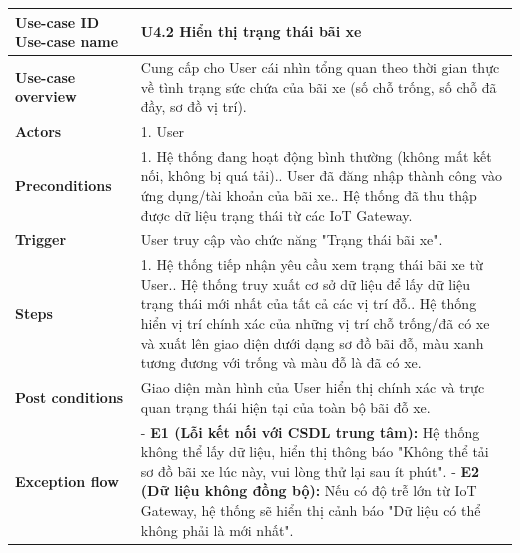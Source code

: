 \vspace{0.5cm}
\noindent
\begin{tabularx}{\textwidth}{|>{\raggedright\arraybackslash}p{4cm}|X|}
\hline
\textbf{Use-case ID} \newline \textbf{Use-case name} & U4.2 \newline  \textbf{Hiển thị trạng thái bãi xe} \\ \hline
\textbf{Use-case overview} & Cung cấp cho User cái nhìn tổng quan theo thời gian thực về tình trạng sức chứa của bãi xe (số chỗ trống, số chỗ đã đầy, sơ đồ vị trí). \\ \hline
\textbf{Actors} & 1. User \\ \hline
\textbf{Preconditions} & 
1. Hệ thống đang hoạt động bình thường (không mất kết nối, không bị quá tải).\newline
2. User đã đăng nhập thành công vào ứng dụng/tài khoản của bãi xe.\newline
3. Hệ thống đã thu thập được dữ liệu trạng thái từ các IoT Gateway.\\ \hline
\textbf{Trigger} & User truy cập vào chức năng "Trạng thái bãi xe". \\ \hline
\textbf{Steps} & 
1. Hệ thống tiếp nhận yêu cầu xem trạng thái bãi xe từ User.\newline
2. Hệ thống truy xuất cơ sở dữ liệu để lấy dữ liệu trạng thái mới nhất của tất cả các vị trí đỗ.\newline
3. Hệ thống hiển vị trí chính xác của những vị trí chỗ trống/đã có xe và xuất lên giao diện dưới dạng sơ đồ bãi đỗ, màu xanh tương đương với trống và màu đỗ là đã có xe. \\ \hline
\textbf{Post conditions} & Giao diện màn hình của User hiển thị chính xác và trực quan trạng thái hiện tại của toàn bộ bãi đỗ xe. \\ \hline
\textbf{Exception flow} & 
- \textbf{E1 (Lỗi kết nối với CSDL trung tâm):} Hệ thống không thể lấy dữ liệu, hiển thị thông báo "Không thể tải sơ đồ bãi xe lúc này, vui lòng thử lại sau ít phút".\newline
- \textbf{E2 (Dữ liệu không đồng bộ):} Nếu có độ trễ lớn từ IoT Gateway, hệ thống sẽ hiển thị cảnh báo "Dữ liệu có thể không phải là mới nhất". \\ \hline
\end{tabularx}
\newpage




